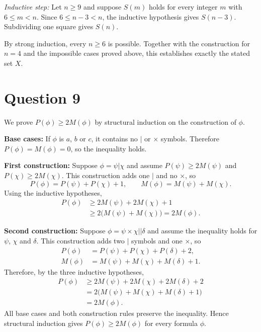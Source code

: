 \documentclass[11pt,a4paper]{article}
\newcommand{\question}[1]{\Needspace{6\baselineskip}\section*{Question #1}}
\begin{document}
\textit{Inductive step:} Let $n\geq9$ and suppose $S(m)$ holds for every integer $m$ with $6\leq m<n$. Since $6\leq n-3<n$, the inductive hypothesis gives $S(n-3)$. Subdividing one square gives $S(n)$.

By strong induction, every $n\geq6$ is possible. Together with the construction for $n=4$ and the impossible cases proved above, this establishes exactly the stated set $X$.

\question{9}
We prove $P(\phi)\geq2M(\phi)$ by structural induction on the construction of $\phi$.

\textbf{Base cases:} If $\phi$ is $a$, $b$ or $c$, it contains no $|$ or $\times$ symbols. Therefore $P(\phi)=M(\phi)=0$, so the inequality holds.

\textbf{First construction:} Suppose $\phi=\psi|\chi$ and assume
$P(\psi)\geq2M(\psi)$ and $P(\chi)\geq2M(\chi)$. This construction adds one $|$ and no $\times$, so
\[
P(\phi)=P(\psi)+P(\chi)+1,
\qquad M(\phi)=M(\psi)+M(\chi).
\]
Using the inductive hypotheses,
\begin{align*}
P(\phi)&\geq2M(\psi)+2M(\chi)+1\\
&\geq2\bigl(M(\psi)+M(\chi)\bigr)=2M(\phi).
\end{align*}

\textbf{Second construction:} Suppose $\phi=\psi\times\chi||\delta$ and assume the inequality holds for $\psi$, $\chi$ and $\delta$. This construction adds two $|$ symbols and one $\times$, so
\begin{align*}
P(\phi)&=P(\psi)+P(\chi)+P(\delta)+2,\\
M(\phi)&=M(\psi)+M(\chi)+M(\delta)+1.
\end{align*}
Therefore, by the three inductive hypotheses,
\begin{align*}
P(\phi)&\geq2M(\psi)+2M(\chi)+2M(\delta)+2\\
&=2\bigl(M(\psi)+M(\chi)+M(\delta)+1\bigr)\\
&=2M(\phi).
\end{align*}
All base cases and both construction rules preserve the inequality. Hence structural induction gives $P(\phi)\geq2M(\phi)$ for every formula $\phi$.
\end{document}
